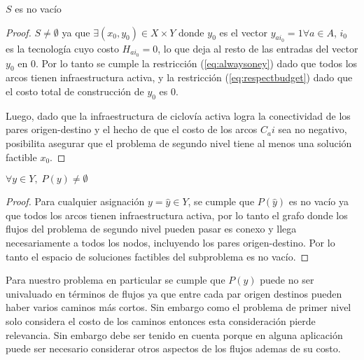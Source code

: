 \begin{lemma}$S$ es no vacío
\end{lemma}

\begin{proof}
$S \neq \emptyset$ ya que $\exists (x_0, y_0) \in X \times Y$ donde $y_0$ es el vector $y_{ai_0} = 1 \forall a \in A$, $i_0$ es la tecnología cuyo costo $H_{ai_0} = 0$, lo que deja al resto de las entradas del vector $y_0$ en $0$. Por lo tanto se cumple la restricción (\ref{eq:alwaysoney}) dado que todos los arcos tienen infraestructura activa, y la restricción (\ref{eq:respectbudget}) dado que el costo total de construcción de $y_0$ es $0$.

Luego, dado que la infraestructura de ciclovía activa logra la conectividad de los pares origen-destino y el hecho de que el costo de los arcos $C_ai$ sea no negativo, posibilita asegurar que el problema de segundo nivel tiene al menos una solución factible $x_0$.
\end{proof}

\begin{lemma}$\forall y \in Y,\; P(y) \neq \emptyset$
\end{lemma}

\begin{proof}
Para cualquier asignación $y = \hat{y} \in Y$, se cumple que $P(\hat{y})$ es no vacío ya que todos los arcos tienen infraestructura activa, por lo tanto el grafo donde los flujos del problema de segundo nivel pueden pasar es conexo y llega necesariamente a todos los nodos, incluyendo los pares origen-destino. Por lo tanto el espacio de soluciones factibles del subproblema es no vacío. 
\end{proof}

Para nuestro problema en particular se cumple que $P(y)$ puede no ser univaluado en términos de flujos ya que entre cada par origen destinos pueden haber varios caminos más cortos. Sin embargo como el problema de primer nivel solo considera el costo de los caminos entonces esta consideración pierde relevancia. Sin embargo debe ser tenido en cuenta porque en alguna aplicación puede ser necesario considerar otros aspectos de los flujos ademas de su costo.
